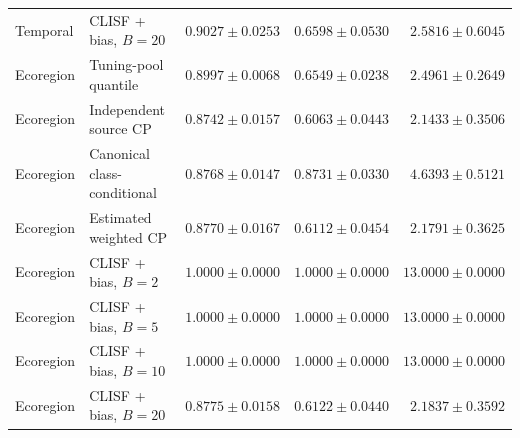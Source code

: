 \begin{table}[htbp]
\begin{tabular}{llrrr}
Temporal & CLISF + bias, $B=20$ & $0.9027\pm0.0253$ & $0.6598\pm0.0530$ & $2.5816\pm0.6045$ \\
Ecoregion & Tuning-pool quantile & $0.8997\pm0.0068$ & $0.6549\pm0.0238$ & $2.4961\pm0.2649$ \\
Ecoregion & Independent source CP & $0.8742\pm0.0157$ & $0.6063\pm0.0443$ & $2.1433\pm0.3506$ \\
Ecoregion & Canonical class-conditional & $0.8768\pm0.0147$ & $0.8731\pm0.0330$ & $4.6393\pm0.5121$ \\
Ecoregion & Estimated weighted CP & $0.8770\pm0.0167$ & $0.6112\pm0.0454$ & $2.1791\pm0.3625$ \\
Ecoregion & CLISF + bias, $B=2$ & $1.0000\pm0.0000$ & $1.0000\pm0.0000$ & $13.0000\pm0.0000$ \\
Ecoregion & CLISF + bias, $B=5$ & $1.0000\pm0.0000$ & $1.0000\pm0.0000$ & $13.0000\pm0.0000$ \\
Ecoregion & CLISF + bias, $B=10$ & $1.0000\pm0.0000$ & $1.0000\pm0.0000$ & $13.0000\pm0.0000$ \\
Ecoregion & CLISF + bias, $B=20$ & $0.8775\pm0.0158$ & $0.6122\pm0.0440$ & $2.1837\pm0.3592$ \\
\bottomrule
\end{tabular}
\end{table}
